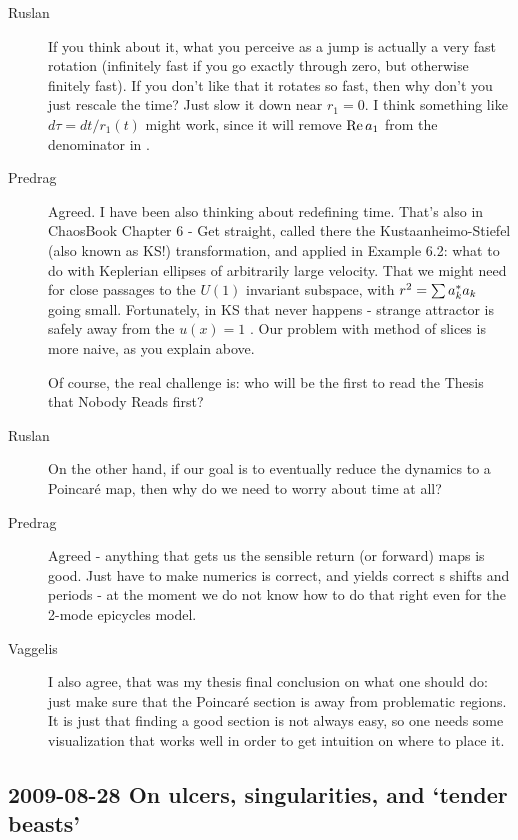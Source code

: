 \begin{description}
\item[Ruslan]
If you think about it, what you perceive as a jump is
actually a very fast rotation (infinitely fast if you go
exactly through zero, but otherwise finitely fast).  If you
don't like that it rotates so fast, then why don't you just
rescale the time?  Just slow it down near $r_1 = 0$.  I think
something like $d\tau = dt/r_1(t)$ might work, since it will
remove ${\rm Re}\,a_1$ from the denominator in
.

\item[Predrag]
Agreed. I have been also thinking about redefining time.
That's also in ChaosBook
 {Chapter 6 - Get straight},
called there the
Kustaanheimo-Stiefel (also known as KS!) transformation, and
applied in Example 6.2: what to do with Keplerian ellipses of
arbitrarily large velocity. That we might need for close
passages to the $U(1)$ invariant subspace, with $r^2 = \sum
a_k^*a_k$ going small. Fortunately, in KS that never
happens - strange attractor is safely away from the $u(x)=1$
\eqv. Our problem with method of slices is more naive, as you
explain above.

Of course, the real challenge is: who will be the first to read the
      {Thesis that Nobody Reads} first?

\item[Ruslan]
On the other hand, if our goal is to eventually reduce the
dynamics to a Poincar\'e map, then why do we need to worry
about time at all?

\item[Predrag]
Agreed - anything that gets us the sensible return (or
forward) maps is good. Just have to make numerics is correct,
and yields correct \rpo s shifts and periods - at the moment
we do not know how to do that right even for the 2-mode
epicycles model.

\item[Vaggelis]
I also agree, that was my thesis final conclusion on what one should do: just
make sure that the Poincar\'e section is away from problematic regions. It is
just that finding a good section is not always easy, so one needs some visualization
that works well in order to get intuition on where to place it.
\end{description}

\subsection{2009-08-28 On ulcers, singularities, and `tender beasts'}

